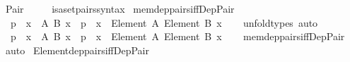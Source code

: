\begin{isabellebody}
\ Pair\ {\isacharparenleft}{\kern0pt}\ {\isachardoublequoteopen}{\isasymtimes}{\isachardoublequoteclose}\ {}{}{\isacharparenright}{\kern0pt}\ \isamarkupfalse%
\isanewline
{}\isamarkupfalse%
\ isa{\isacharunderscore}{\kern0pt}set{\isacharunderscore}{\kern0pt}pairs{\isacharunderscore}{\kern0pt}syntax\isanewline
\isanewline
{}\isamarkupfalse%
\ mem{\isacharunderscore}{\kern0pt}dep{\isacharunderscore}{\kern0pt}pairs{\isacharunderscore}{\kern0pt}iff{\isacharunderscore}{\kern0pt}Dep{\isacharunderscore}{\kern0pt}Pair{\isacharcolon}{\kern0pt}\isanewline
\ \ {\isachardoublequoteopen}p\ {\isasymin}\ {\isacharparenleft}{\kern0pt}{\isasymSum}x\ {\isasymin}\ A{\isachardot}{\kern0pt}\ {\isacharparenleft}{\kern0pt}B\ x{\isacharparenright}{\kern0pt}{\isacharparenright}{\kern0pt}\ {\isasymlongleftrightarrow}\ p\ {\isacharcolon}{\kern0pt}\ {\isasymSum}x\ {\isacharcolon}{\kern0pt}\ Element\ A{\isachardot}{\kern0pt}\ {\isacharparenleft}{\kern0pt}Element\ {\isacharparenleft}{\kern0pt}B\ x{\isacharparenright}{\kern0pt}{\isacharparenright}{\kern0pt}{\isachardoublequoteclose}\isanewline
%
\isadelimproof
\ \ %
\endisadelimproof
%
\isatagproof
{}\isamarkupfalse%
\ unfold{\isacharunderscore}{\kern0pt}types\ auto%
\endisatagproof
{\isafoldproof}%
%
\isadelimproof
\isanewline
%
\endisadelimproof
\isanewline
{}\isamarkupfalse%
\isanewline
\ \ {\isachardoublequoteopen}p\ {\isasymin}\ {\isasymSum}x\ {\isasymin}\ A{\isachardot}{\kern0pt}\ {\isacharparenleft}{\kern0pt}B\ x{\isacharparenright}{\kern0pt}{\isachardoublequoteclose}\ {\isasymrightleftharpoons}\ {\isachardoublequoteopen}p\ {\isacharcolon}{\kern0pt}\ {\isasymSum}x\ {\isacharcolon}{\kern0pt}\ Element\ A{\isachardot}{\kern0pt}\ {\isacharparenleft}{\kern0pt}Element\ {\isacharparenleft}{\kern0pt}B\ x{\isacharparenright}{\kern0pt}{\isacharparenright}{\kern0pt}{\isachardoublequoteclose}\isanewline
%
\isadelimproof
\ \ %
\endisadelimproof
%
\isatagproof
{}\isamarkupfalse%
\ mem{\isacharunderscore}{\kern0pt}dep{\isacharunderscore}{\kern0pt}pairs{\isacharunderscore}{\kern0pt}iff{\isacharunderscore}{\kern0pt}Dep{\isacharunderscore}{\kern0pt}Pair\ \isamarkupfalse%
\ auto%
\endisatagproof
{\isafoldproof}%
%
\isadelimproof
\isanewline
%
\endisadelimproof
\isanewline
\isanewline
{}\isamarkupfalse%
\ Element{\isacharunderscore}{\kern0pt}dep{\isacharunderscore}{\kern0pt}pairs{\isacharunderscore}{\kern0pt}iff{\isacharunderscore}{\kern0pt}Dep{\isacharunderscore}{\kern0pt}Pair{\isacharcolon}{\kern0pt}\isanewline

\end{isabellebody}
